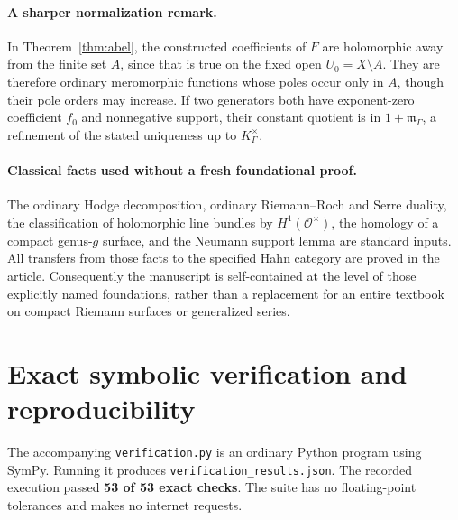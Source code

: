 \documentclass[11pt,letterpaper]{article}
\numberwithin{equation}{section}
\theoremstyle{definition}
\theoremstyle{remark}
\newcommand{\OO}{\mathcal O}
\newcommand{\mm}{\mathfrak m}
\newcommand{\Kg}{K_\Gamma}
\newcommand{\mg}{\mm_\Gamma}
\begin{document}
\paragraph{A sharper normalization remark.}
In Theorem~\ref{thm:abel}, the constructed coefficients of $F$ are
holomorphic away from the finite set $A$, since that is true on the
fixed open $U_0=X\setminus A$. They are therefore ordinary meromorphic
functions whose poles occur only in $A$, though their pole orders may
increase. If two generators both have exponent-zero coefficient $f_0$
and nonnegative support, their constant quotient is in $1+\mg$,
a refinement of the stated uniqueness up to $\Kg^\times$.

\paragraph{Classical facts used without a fresh foundational proof.}
The ordinary Hodge decomposition, ordinary Riemann--Roch and Serre
duality, the classification of holomorphic line bundles by
$H^1(\OO^\times)$, the homology of a compact genus-$g$ surface, and the
Neumann support lemma are standard inputs. All transfers from those
facts to the specified Hahn category are proved in the article.
Consequently the manuscript is self-contained at the level of those
explicitly named foundations, rather than a replacement for an entire
textbook on compact Riemann surfaces or generalized series.

\section{Exact symbolic verification and reproducibility}
\label{app:checks}

The accompanying \texttt{verification.py} is an ordinary Python program
using SymPy. Running it produces \texttt{verification\_results.json}.
The recorded execution passed \textbf{53 of 53 exact checks}. The suite
has no floating-point tolerances and makes no internet requests.
\end{document}

